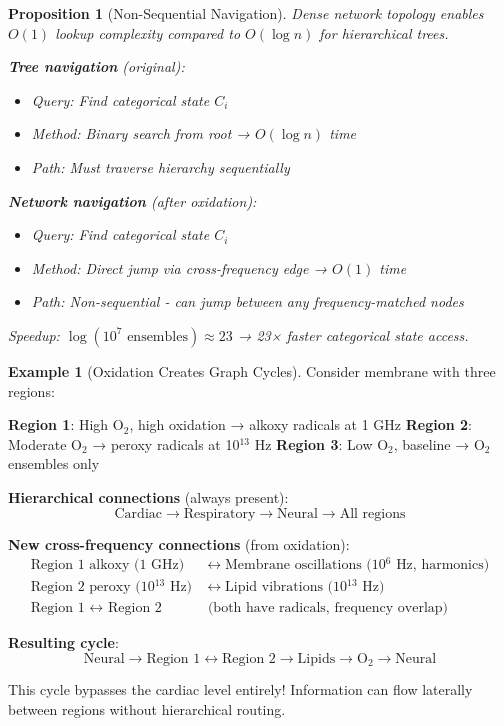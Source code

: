 \documentclass[11pt,a4paper]{article}
\newtheorem{proposition}[theorem]{Proposition}
\theoremstyle{definition}
\newtheorem{example}[theorem]{Example}
\theoremstyle{remark}
\begin{document}
\begin{proposition}[Non-Sequential Navigation]
Dense network topology enables $O(1)$ lookup complexity compared to $O(\log n)$ for hierarchical trees.

\textbf{Tree navigation} (original):
\begin{itemize}
\item Query: Find categorical state $C_i$
\item Method: Binary search from root → $O(\log n)$ time
\item Path: Must traverse hierarchy sequentially
\end{itemize}

\textbf{Network navigation} (after oxidation):
\begin{itemize}
\item Query: Find categorical state $C_i$
\item Method: Direct jump via cross-frequency edge → $O(1)$ time
\item Path: Non-sequential - can jump between any frequency-matched nodes
\end{itemize}

Speedup: $\log(10^7 \text{ ensembles}) \approx 23$ → 23× faster categorical state access.
\end{proposition}

\begin{example}[Oxidation Creates Graph Cycles]
Consider membrane with three regions:

\textbf{Region 1}: High O$_2$, high oxidation → alkoxy radicals at 1 GHz
\textbf{Region 2}: Moderate O$_2$ → peroxy radicals at 10$^{13}$ Hz  
\textbf{Region 3}: Low O$_2$, baseline → O$_2$ ensembles only

\textbf{Hierarchical connections} (always present):
\begin{equation}
\text{Cardiac} \to \text{Respiratory} \to \text{Neural} \to \text{All regions}
\end{equation}

\textbf{New cross-frequency connections} (from oxidation):
\begin{align}
\text{Region 1 alkoxy (1 GHz)} &\leftrightarrow \text{Membrane oscillations (10$^{6}$ Hz, harmonics)} \\
\text{Region 2 peroxy (10$^{13}$ Hz)} &\leftrightarrow \text{Lipid vibrations (10$^{13}$ Hz)} \\
\text{Region 1 }\leftrightarrow \text{ Region 2} &\text{ (both have radicals, frequency overlap)}
\end{align}

\textbf{Resulting cycle}:
\begin{equation}
\text{Neural} \to \text{Region 1} \leftrightarrow \text{Region 2} \to \text{Lipids} \to \text{O}_2 \to \text{Neural}
\end{equation}

This cycle bypasses the cardiac level entirely! Information can flow laterally between regions without hierarchical routing.
\end{example}
\end{document}
